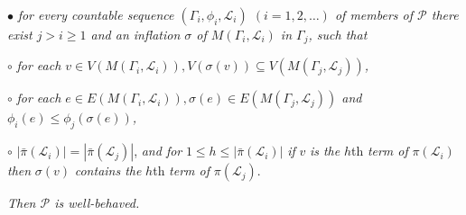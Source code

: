 \hspace*{12pt}$\bullet$ \textit{for every countable sequence $(\Gamma_i, \phi_i, \mathscr{L}_i)$ $(i = 1, 2, \dots)$ of members of $\mathscr{P}$ there exist $j > i \ge 1$ and an inflation $\sigma$ of $M(\Gamma_i, \mathscr{L}_i)$ in $\Gamma_j$, such that}

\hspace*{24pt}$\circ$ \textit{for each $v \in V(M(\Gamma_i, \mathscr{L}_i)), V(\sigma(v)) \subseteq V(M(\Gamma_j, \mathscr{L}_j))$,}

\hspace*{24pt}$\circ$ \textit{for each $e \in E(M(\Gamma_i, \mathscr{L}_i)), \sigma(e) \in E(M(\Gamma_j, \mathscr{L}_j))$ and $\phi_i(e) \le \phi_j(\sigma(e))$,}

\hspace*{24pt}$\circ$ $|\bar{\pi}(\mathscr{L}_i)| = |\bar{\pi}(\mathscr{L}_j)|$, \textit{and for} $1 \le h \le |\bar{\pi}(\mathscr{L}_i)|$ \textit{if} $v$ \textit{is the} $h$th \textit{term of} $\pi(\mathscr{L}_i)$ \textit{then} $\sigma(v)$ \textit{contains the} $h$th \textit{term of} $\pi(\mathscr{L}_j)$.

\textit{Then $\mathscr{P}$ is well-behaved.}

